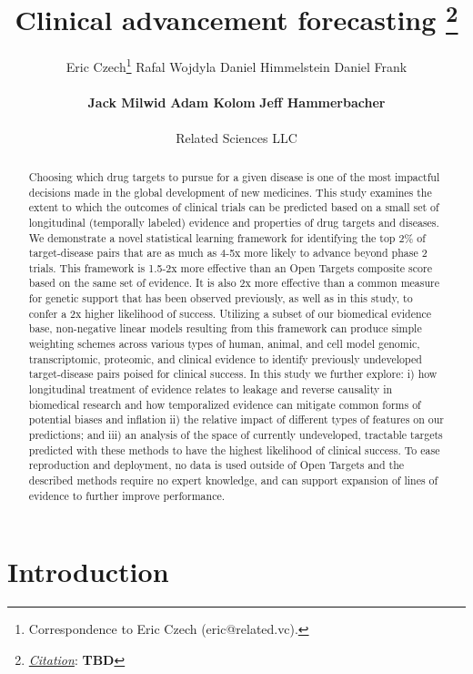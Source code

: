 \documentclass{article}
\title{Clinical advancement forecasting
\thanks{\textit{\underline{Citation}}: 
\textbf{TBD}} 
}
\author{
  Eric Czech\thanks{Correspondence to Eric Czech (eric@related.vc).} \hspace{0.2cm} 
  Rafal Wojdyla \hspace{0.2cm} 
  Daniel Himmelstein \hspace{0.2cm}
  Daniel Frank \hspace{0.2cm} 
  \\ \\
  \textbf{Jack Milwid} \hspace{0.2cm} 
  \textbf{Adam Kolom} \hspace{0.2cm} 
  \textbf{Jeff Hammerbacher}
  \\ \\
  Related Sciences LLC
}
\begin{document}
\maketitle


\def\evaluationDatasetPairCount{9010}
\def\topRankingPct{2}
\def\bottomRankingPct{98}

\begin{abstract}
Choosing which drug targets to pursue for a given disease is one of the most impactful decisions made in the global development of new medicines. This study examines the extent to which the outcomes of clinical trials can be predicted based on a small set of longitudinal (temporally labeled) evidence and properties of drug targets and diseases. We demonstrate a novel statistical learning framework for identifying the top \topRankingPct\% of target-disease pairs that are as much as 4-5x more likely to advance beyond phase 2 trials. This framework is 1.5-2x more effective than an Open Targets composite score based on the same set of evidence. It is also 2x more effective than a common measure for genetic support that has been observed previously, as well as in this study, to confer a 2x higher likelihood of success. Utilizing a subset of our biomedical evidence base, non-negative linear models resulting from this framework can produce simple weighting schemes across various types of human, animal, and cell model genomic, transcriptomic, proteomic, and clinical evidence to identify previously undeveloped target-disease pairs poised for clinical success. In this study we further explore: i) how longitudinal treatment of evidence relates to leakage and reverse causality in biomedical research and how temporalized evidence can mitigate common forms of potential biases and inflation ii) the relative impact of different types of features on our predictions; and iii) an analysis of the space of currently undeveloped, tractable targets predicted with these methods to have the highest likelihood of clinical success. To ease reproduction and deployment, no data is used outside of Open Targets and the described methods require no expert knowledge, and can support expansion of lines of evidence to further improve performance.
\end{abstract}

\section{Introduction}
\label{sec:introduction}
\end{document}

